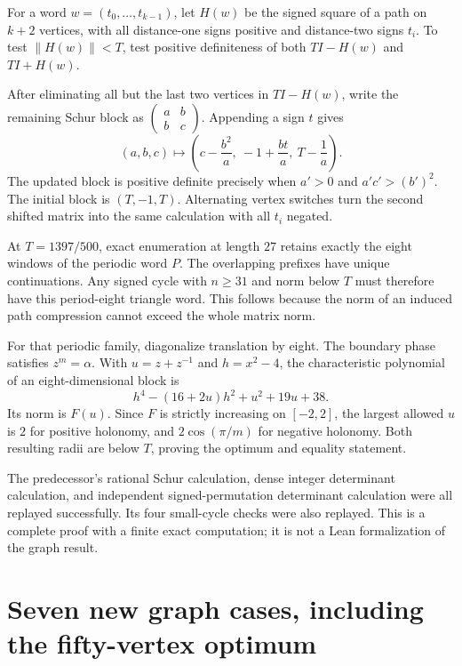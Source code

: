 For a word \(w=(t_0,\ldots,t_{k-1})\), let \(H(w)\) be the signed square of
a path on \(k+2\) vertices, with all distance-one signs positive and
distance-two signs \(t_i\). To test \(\|H(w)\|<T\), test positive
definiteness of both \(TI-H(w)\) and \(TI+H(w)\).

After eliminating all but the last two vertices in \(TI-H(w)\), write the
remaining Schur block as
\(\left(\begin{smallmatrix}a&b\\b&c\end{smallmatrix}\right)\).
Appending a sign \(t\) gives
\begin{equation}
(a,b,c)\longmapsto
\left(c-\frac{b^2}{a},\ -1+\frac{bt}{a},\ T-\frac1a\right).
\label{eq:schur}
\end{equation}
The updated block is positive definite precisely when \(a'>0\) and
\(a'c'>(b')^2\). The initial block is \((T,-1,T)\). Alternating vertex
switches turn the second shifted matrix into the same calculation with
all \(t_i\) negated.

At \(T=1397/500\), exact enumeration at length \(27\) retains exactly the
eight windows of the periodic word \(P\). The overlapping prefixes have
unique continuations. Any signed cycle with \(n\ge31\) and norm below \(T\)
must therefore have this period-eight triangle word. This follows because
the norm of an induced path compression cannot exceed the whole matrix norm.

For that periodic family, diagonalize translation by eight. The boundary
phase satisfies \(z^m=\alpha\). With \(u=z+z^{-1}\) and \(h=x^2-4\), the
characteristic polynomial of an eight-dimensional block is
\[
h^4-(16+2u)h^2+u^2+19u+38.
\]
Its norm is \(F(u)\). Since \(F\) is strictly increasing on \([-2,2]\),
the largest allowed \(u\) is \(2\) for positive holonomy, and
\(2\cos(\pi/m)\) for negative holonomy. Both resulting radii are below
\(T\), proving the optimum and equality statement.

The predecessor's rational Schur calculation, dense integer determinant
calculation, and independent signed-permutation determinant calculation
were all replayed successfully. Its four small-cycle checks were also
replayed. This is a complete proof with a finite exact computation; it is
not a Lean formalization of the graph result.

\clearpage
\section{Seven new graph cases, including the fifty-vertex optimum}
\label{sec:newgraphs}

